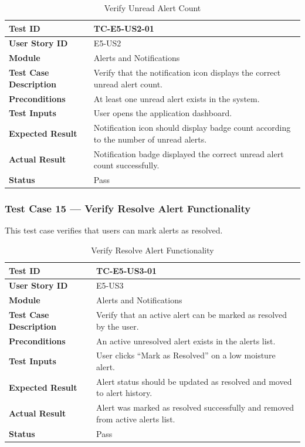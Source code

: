 \begin{longtable}{|p{4cm}|p{8cm}|}
\caption{Verify Unread Alert Count}
\label{tab:tc_unread_alerts} \\
\hline
\textbf{Test ID} & TC-E5-US2-01 \\ \hline
\textbf{User Story ID} & E5-US2 \\ \hline
\textbf{Module} & Alerts and Notifications \\ \hline
\textbf{Test Case Description} & Verify that the notification icon 
displays the correct unread alert count. \\ \hline
\textbf{Preconditions} & At least one unread alert exists in the 
system. \\ \hline
\textbf{Test Inputs} & User opens the application dashboard. \\ 
\hline
\textbf{Expected Result} & Notification icon should display badge 
count according to the number of unread alerts. \\ \hline
\textbf{Actual Result} & Notification badge displayed the correct 
unread alert count successfully. \\ \hline
\textbf{Status} & Pass \\ \hline
\end{longtable}

\subsubsection{Test Case 15 --- Verify Resolve Alert Functionality}

This test case verifies that users can mark alerts as resolved.

\begin{longtable}{|p{4cm}|p{8cm}|}
\caption{Verify Resolve Alert Functionality}
\label{tab:tc_resolve_alert} \\
\hline
\textbf{Test ID} & TC-E5-US3-01 \\ \hline
\textbf{User Story ID} & E5-US3 \\ \hline
\textbf{Module} & Alerts and Notifications \\ \hline
\textbf{Test Case Description} & Verify that an active alert can 
be marked as resolved by the user. \\ \hline
\textbf{Preconditions} & An active unresolved alert exists in the 
alerts list. \\ \hline
\textbf{Test Inputs} & User clicks ``Mark as Resolved'' on a low 
moisture alert. \\ \hline
\textbf{Expected Result} & Alert status should be updated as 
resolved and moved to alert history. \\ \hline
\textbf{Actual Result} & Alert was marked as resolved successfully 
and removed from active alerts list. \\ \hline
\textbf{Status} & Pass \\ \hline
\end{longtable}

